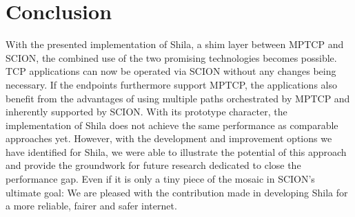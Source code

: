 \chapter{Conclusion}
\label{chap:Conclusion}

With the presented implementation of Shila, a shim layer between MPTCP and SCION, the combined use of the two promising technologies becomes possible. TCP applications can now be operated via SCION without any changes being necessary. If the endpoints furthermore support MPTCP, the applications also benefit from the advantages of using multiple paths orchestrated by MPTCP and inherently supported by SCION. With its prototype character, the implementation of Shila does not achieve the same performance as comparable approaches yet. However, with the development and improvement options we have identified for Shila, we were able to illustrate the potential of this approach and provide the groundwork for future research dedicated to close the performance gap. Even if it is only a tiny piece of the mosaic in SCION's ultimate goal: We are pleased with the contribution made in developing Shila for a more reliable, fairer and safer internet.